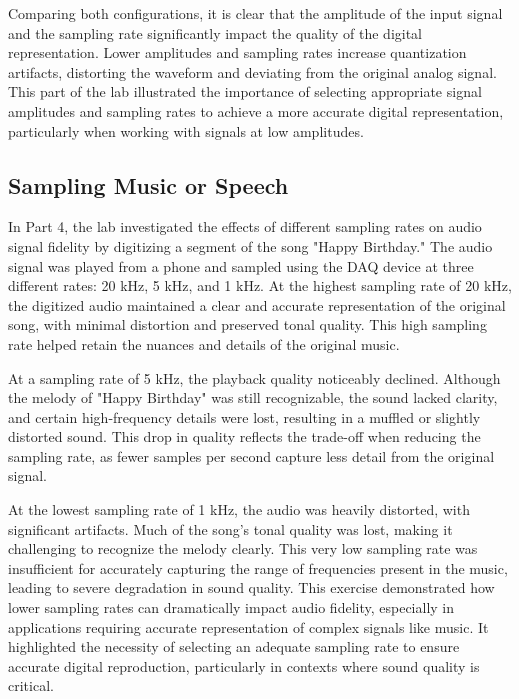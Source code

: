 \documentclass[12pt]{article}
\begin{document}
Comparing both configurations, it is clear that the amplitude of the 
input signal and the sampling rate significantly impact the quality 
of the digital representation. Lower amplitudes and sampling rates 
increase quantization artifacts, distorting the waveform and deviating 
from the original analog signal. This part of the lab illustrated the 
importance of selecting appropriate signal amplitudes and sampling rates 
to achieve a more accurate digital representation, particularly when 
working with signals at low amplitudes.
\newline

\subsection{Sampling Music or Speech}
In Part 4, the lab investigated the effects of different sampling rates on audio 
signal fidelity by digitizing a segment of the song "Happy Birthday." The audio 
signal was played from a phone and sampled using the DAQ device at three different 
rates: 20 kHz, 5 kHz, and 1 kHz. At the highest sampling rate of 20 kHz, the 
digitized audio maintained a clear and accurate representation of the original 
song, with minimal distortion and preserved tonal quality. This high sampling 
rate helped retain the nuances and details of the original music.
\newline

At a sampling rate of 5 kHz, the playback quality noticeably declined. Although 
the melody of "Happy Birthday" was still recognizable, the sound lacked clarity, 
and certain high-frequency details were lost, resulting in a muffled or slightly 
distorted sound. This drop in quality reflects the trade-off when reducing the 
sampling rate, as fewer samples per second capture less detail from the original 
signal.
\newline

At the lowest sampling rate of 1 kHz, the audio was heavily distorted, with 
significant artifacts. Much of the song’s tonal quality was lost, making it 
challenging to recognize the melody clearly. This very low sampling rate was 
insufficient for accurately capturing the range of frequencies present in the 
music, leading to severe degradation in sound quality. This exercise demonstrated 
how lower sampling rates can dramatically impact audio fidelity, especially in 
applications requiring accurate representation of complex signals like music. 
It highlighted the necessity of selecting an adequate sampling rate to ensure 
accurate digital reproduction, particularly in contexts where sound quality is 
critical.
\newline
\end{document}
